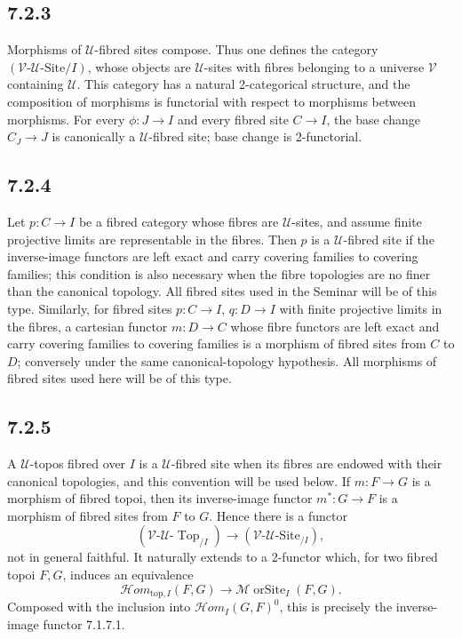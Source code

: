 \documentclass[11pt]{article}
\newcommand{\U}{\mathcal{U}}
\newcommand{\V}{\mathcal{V}}
\newcommand{\Top}{\operatorname{Top}}
\newcommand{\Mmorsite}{\mathcal{M}\!\operatorname{orSite}}
\begin{document}
\subsection*{7.2.3}
Morphisms of \(\U\)-fibred sites compose. Thus one defines the category \((\V\text{-}\U\text{-Site}/I)\), whose objects are \(\U\)-sites with fibres belonging to a universe \(\V\) containing \(\U\). This category has a natural 2-categorical structure, and the composition of morphisms is functorial with respect to morphisms between morphisms. For every \(\phi:J\to I\) and every fibred site \(C\to I\), the base change \(C_J\to J\) is canonically a \(\U\)-fibred site; base change is 2-functorial.

\subsection*{7.2.4}
Let \(p:C\to I\) be a fibred category whose fibres are \(\U\)-sites, and assume finite projective limits are representable in the fibres. Then \(p\) is a \(\U\)-fibred site if the inverse-image functors are left exact and carry covering families to covering families; this condition is also necessary when the fibre topologies are no finer than the canonical topology. All fibred sites used in the Seminar will be of this type. Similarly, for fibred sites \(p:C\to I\), \(q:D\to I\) with finite projective limits in the fibres, a cartesian functor \(m:D\to C\) whose fibre functors are left exact and carry covering families to covering families is a morphism of fibred sites from \(C\) to \(D\); conversely under the same canonical-topology hypothesis. All morphisms of fibred sites used here will be of this type.

\subsection*{7.2.5}
A \(\U\)-topos fibred over \(I\) is a \(\U\)-fibred site when its fibres are endowed with their canonical topologies, and this convention will be used below. If \(m:F\to G\) is a morphism of fibred topoi, then its inverse-image functor \(m^*:G\to F\) is a morphism of fibred sites from \(F\) to \(G\). Hence there is a functor
\[
 (\V\text{-}\U\text{-}\Top_{/I})\to(\V\text{-}\U\text{-Site}_{/I}),
\]
not in general faithful. It naturally extends to a 2-functor which, for two fibred topoi \(F,G\), induces an equivalence
\[
 \mathcal{H}om_{\mathrm{top},I}(F,G)\to\Mmorsite_I(F,G). \tag{7.2.5.1}
\]
Composed with the inclusion into \(\mathcal{H}om_I(G,F)^0\), this is precisely the inverse-image functor 7.1.7.1.
\end{document}
